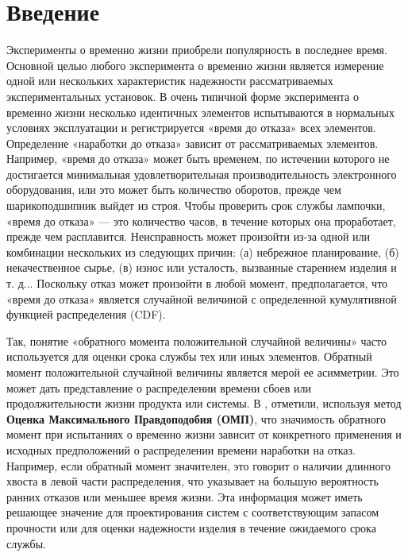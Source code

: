 \documentclass[13pt]{article}
\begin{document}


\makenomenclature
\newpage



\newpage

\newpage

\tableofcontents
\nocite{*}   %


\vspace{-1cm}


\newpage

\newpage

\section*{Введение}
Эксперименты о временно жизни приобрели популярность в последнее время. Основной целью любого эксперимента о временно жизни является измерение одной или нескольких характеристик надежности рассматриваемых экспериментальных установок. В очень типичной форме эксперимента о временно жизни несколько идентичных элементов испытываются в нормальных условиях эксплуатации и регистрируется «время до отказа» всех элементов. Определение «наработки до отказа» зависит от рассматриваемых элементов. Например, «время до отказа» может быть временем, по истечении которого не достигается минимальная удовлетворительная производительность электронного оборудования, или это может быть количество оборотов, прежде чем шарикоподшипник выйдет из строя. Чтобы проверить срок службы лампочки, «время до отказа» — это количество часов, в течение которых она проработает, прежде чем расплавится. Неисправность может произойти из-за одной или комбинации нескольких из следующих причин: (а) небрежное планирование, (б) некачественное сырье, (в) износ или усталость, вызванные старением изделия и т. д... Поскольку отказ может произойти в любой момент, предполагается, что «время до отказа» является случайной величиной с определенной кумулятивной функцией распределения (CDF).

Так, понятие «обратного момента положительной случайной величины» часто используется для оценки срока службы тех или иных элементов. Обратный момент положительной случайной величины является мерой ее асимметрии. Это может дать представление о распределении времени сбоев или продолжительности жизни продукта или системы. В \cite{mendenhall1960approximation}, отметили, используя метод \textbf{Оценка Максимального Правдоподобия (ОМП)}, что значимость обратного момент при испытаниях о временно жизни зависит от конкретного применения и исходных предположений о распределении времени наработки на отказ. Например, если обратный момент значителен, это говорит о наличии длинного хвоста в левой части распределения, что указывает на большую вероятность ранних отказов или меньшее время жизни. Эта информация может иметь решающее значение для проектирования систем с соответствующим запасом прочности или для оценки надежности изделия в течение ожидаемого срока службы. 
\end{document}
